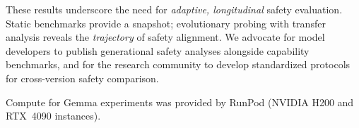 \documentclass{article}
\begin{document}
These results underscore the need for \emph{adaptive, longitudinal}
safety evaluation. Static benchmarks provide a snapshot; evolutionary
probing with transfer analysis reveals the \emph{trajectory} of safety
alignment. We advocate for model developers to publish generational
safety analyses alongside capability benchmarks, and for the research
community to develop standardized protocols for cross-version
safety comparison.


\begin{ack}
Compute for Gemma experiments was provided by RunPod (NVIDIA H200
and RTX~4090 instances).
\end{ack}



\end{document}
